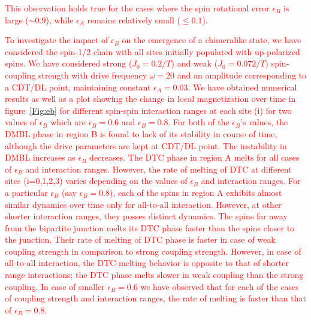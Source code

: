 \documentclass[12pt]{iopart}
\newcommand{\red}[1]{\textcolor{red}{#1}}
\begin{document}
\red{This observation holds true for the cases where the spin rotational error $\epsilon_B$ is large ($\sim 0.9$), while $\epsilon_A$ remains relatively small ($\le 0.1$).}

\red{To investigate the impact of $\epsilon_B$ on the emergence of a chimeralike state, we have considered the spin-1/2 chain with all sites initially populated with up-polarized spins. We have considered strong ($J_0 = 0.2/T$) and weak ($J_0 = 0.072/T$) spin-coupling strength with drive frequency $\omega = 20$ and an amplitude corresponding to a CDT/DL point, maintaining constant $\epsilon_A=0.03$. We have obtained numerical results as well as a plot showing the change in local magnetization over time in figure~\ref{Fig:eb} for different spin-spin interaction ranges at each site (i) for two values of $\epsilon_B$ which are $\epsilon_B = 0.6$ and $\epsilon_B = 0.8$. For both of the $\epsilon_B$'s values, the DMBL phase in region B is found to lack of its stability in course of time, although the drive parameters are kept at CDT/DL point. The instability in DMBL increases as $\epsilon_B$ decreases. The DTC phase in region A melts for all cases of $\epsilon_B$ and interaction ranges. However, the rate of melting of DTC at different sites (i=0,1,2,3) varies depending on the values of $\epsilon_B$ and interaction ranges. For a particular $\epsilon_B$ (say $\epsilon_B=0.8$), each of the spins in region A exhibits almost similar dynamics over time only for all-to-all interaction. However, at other shorter interaction ranges, they posses distinct dynamics. The spins far away from the bipartite junction melts its DTC phase faster than the spins closer to the junction. Their rate of melting of DTC phase is faster in case of weak coupling strength in comparison to strong coupling strength. However, in case of all-to-all interaction, the DTC-melting behavior is opposite to that of shorter range interactions; the DTC phase melts slower in weak coupling than the strong coupling. In case of smaller $\epsilon_B=0.6$ we have observed that for each of the cases of coupling strength and interaction ranges, the rate of melting is faster than that of $\epsilon_B=0.8$.}
\end{document}
